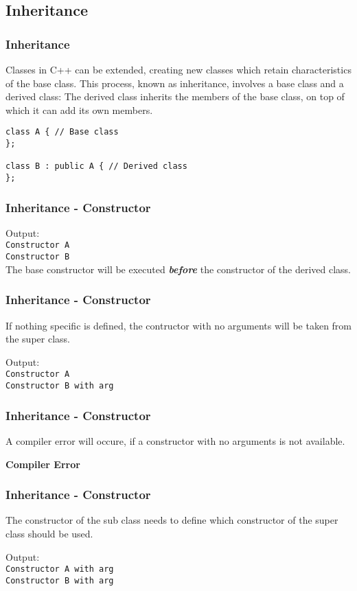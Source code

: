 \subsection{Inheritance}

\begin{frame}[fragile]
\frametitle{Inheritance}
{\small
Classes in C++ can be extended, creating new classes which retain characteristics of the base class.
This process, known as inheritance, involves a base class and a derived class: The derived class
inherits the members of the base class, on top of which it can add its own members.
\begin{lstlisting}
class A { // Base class
};

class B : public A { // Derived class
};
\end{lstlisting}
}
\end{frame}

\begin{frame}[fragile]
\frametitle{Inheritance - Constructor}
{\tiny

Output:\\
\verb|Constructor A|\\
\verb|Constructor B|\\
The base constructor will be executed {\bf\emph{before}} the constructor of the derived class.
}
\end{frame}

\begin{frame}[fragile]
\frametitle{Inheritance - Constructor}
If nothing specific is defined, the contructor with no arguments will be taken
from the super class.
{\tiny

Output:\\
\verb|Constructor A|\\
\verb|Constructor B with arg|\\
}
\end{frame}

\begin{frame}[fragile]
\frametitle{Inheritance - Constructor}
A compiler error will occure, if a constructor with no arguments
is not available.
{\tiny

\bf{Compiler Error}
}
\end{frame}

\begin{frame}[fragile]
\frametitle{Inheritance - Constructor}
The constructor of the sub class needs to define which constructor of the
super class should be used.
{\tiny

Output:\\
\verb|Constructor A with arg|\\
\verb|Constructor B with arg|\\
}
\end{frame}

